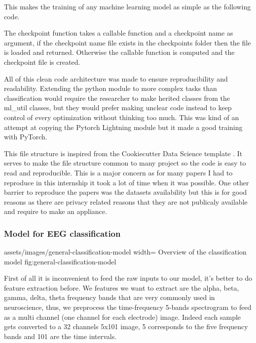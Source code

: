 This makes the training of any machine learning model as simple as the following
code.





The checkpoint function takes a callable function and a checkpoint name as
argument, if the checkpoint name file exists in the checkpoints folder then the
file is loaded and returned. Otherwise the callable function is computed and the
checkpoint file is created.

All of this clean code architecture was made to ensure reproducibility and
readability. Extending the python module to more complex tasks than
classification would require the researcher to make herited classes from the
ml\_util classes, but they would prefer making unclear code instead to keep
control of every optimization without thinking too much. This was kind of an
attempt at copying the Pytorch Lightning module but it made a good training with
PyTorch.

This file structure is inspired from the Cookiecutter Data Science template
\cite{ccds}. It serves to make the file structure common to many project so the
code is easy to read and reproducible. This is a major concern as for many
papers I had to reproduce in this internship it took a lot of time when it was
possible. One other barrier to reproduce the papers was the datasets
availability but this is for good reasons as there are privacy related reasons
that they are not publicaly available and require to make an appliance.

\subsubsection{Model for EEG classification}

\insertfigure
    {assets/images/general-classification-model}
    {width=\textwidth}
    {Overview of the classification model}
    {fig:general-classification-model}

First of all it is inconvenient to feed the raw inputs to our model, it's better
to do feature extraction before.  We features we want to extract are the alpha,
beta, gamma, delta, theta frequency bands that are very commonly used in
neuroscience, thus, we preprocess the time-frequency 5-bands spectrogram to feed
as a multi channel (one channel for each electrode) image. Indeed each sample
gets converted to a 32 channels 5x101 image, 5 corresponds to the five frequency
bands and 101 are the time intervals.

